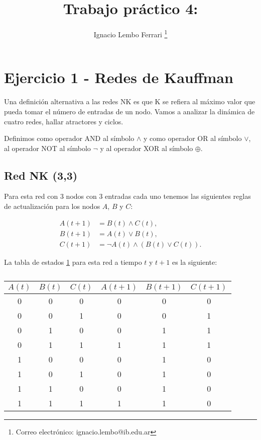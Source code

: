 \documentclass[letterpaper,12pt]{article}
\title{Trabajo práctico 4: } %
\author[1]{Ignacio Lembo Ferrari \thanks{Correo electrónico: ignacio.lembo@ib.edu.ar}}
\affil[1]{Instituto Balseiro}
\date{\vspace{-4ex}}
\theoremstyle{plain}
\begin{document}
\maketitle

\section*{Ejercicio 1 - Redes de Kauffman}

Una definición alternativa a las redes NK es que K se refiera al máximo valor que pueda tomar el número de entradas de un nodo. Vamos a analizar la dinámica de cuatro redes, hallar atractores y ciclos.

Definimos como operador AND al símbolo $\land$ y como operador OR al símbolo $\lor$, al operador NOT al símbolo $\lnot$ y al operador XOR al símbolo $\oplus$. 

\subsection*{Red NK (3,3)}

Para esta red con 3 nodos con 3 entradas cada uno tenemos las siguientes reglas de actualización para los nodos $A$, $B$ y $C$:

\begin{align}
    A(t+1) &= B(t) \land C(t), \\
    B(t+1) &= A(t) \lor B(t), \\
    C(t+1) &= \lnot A(t) \land (B(t) \lor C(t)). 
\end{align}

La tabla de estados \ref*{tab:1} para esta red a tiempo $t$ y $t+1$ es la siguiente:
\newpage
\begin{table}[h]
    \centering
    \begin{tabular}{|c|c|c|c|c|c|}
        \hline
        $A(t)$ & $B(t)$ & $C(t)$ & $A(t+1)$ & $B(t+1)$ & $C(t+1)$ \\
        \hline
        0 & 0 & 0 & 0 & 0 & 0  \\
        0 & 0 & 1 & 0 & 0 & 1  \\
        0 & 1 & 0 & 0 & 1 & 1 \\
        0 & 1 & 1 & 1 & 1 & 1  \\
        1 & 0 & 0 & 0 & 1 & 0  \\
        1 & 0 & 1 & 0 & 1 & 0  \\
        1 & 1 & 0 & 0 & 1 & 0  \\
        1 & 1 & 1 & 1 & 1 & 0  \\
        \hline
\end{tabular}
\caption{}
\label{tab:1}
\end{table}
\end{document}
